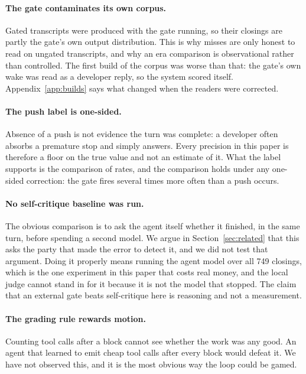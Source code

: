\paragraph{The gate contaminates its own corpus.} Gated transcripts were
produced with the gate running, so their closings are partly the gate's own
output distribution. This is why misses are only honest to read on ungated
transcripts, and why an era comparison is observational rather than controlled.
The first build of the corpus was worse than that: the gate's own wake was
read as a developer reply, so the system scored itself. Appendix~\ref{app:builds}
says what changed when the readers were corrected.

\paragraph{The push label is one-sided.} Absence of a push is not evidence the
turn was complete: a developer often absorbs a premature stop and simply
answers. Every precision in this paper is therefore a floor on the true value
and not an estimate of it. What the label supports is the comparison of rates,
and the comparison holds under any one-sided correction: the gate fires several
times more often than a push occurs.

\paragraph{No self-critique baseline was run.} The obvious comparison is to
ask the agent itself whether it finished, in the same turn, before spending a
second model. We argue in Section~\ref{sec:related} that this asks the party
that made the error to detect it, and we did not test that argument. Doing it
properly means running the agent model over all 749 closings, which is the one
experiment in this paper that costs real money, and the local judge cannot
stand in for it because it is not the model that stopped. The claim that an
external gate beats self-critique here is reasoning and not a measurement.

\paragraph{The grading rule rewards motion.} Counting tool calls after a block
cannot see whether the work was any good. An agent that learned to emit cheap
tool calls after every block would defeat it. We have not observed this, and it
is the most obvious way the loop could be gamed.

